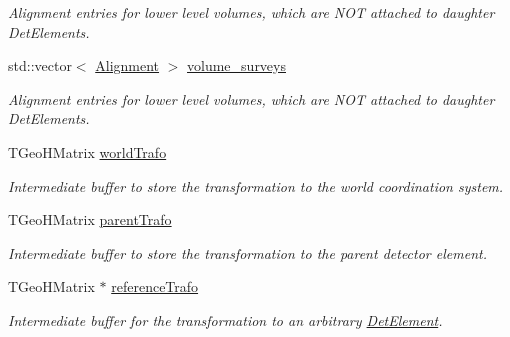 \begin{DoxyCompactItemize}
\begin{DoxyCompactList}\small\item\em Alignment entries for lower level volumes, which are N\+OT attached to daughter Det\+Elements. \end{DoxyCompactList}\item 
std\+::vector$<$ \hyperlink{class_d_d4hep_1_1_geometry_1_1_det_element_object_aaf1bb49d0e1799f548f775b35e3cb590}{Alignment} $>$ \hyperlink{class_d_d4hep_1_1_geometry_1_1_det_element_object_a7fdbe44b6eee280dc2197b7627c2012e}{volume\+\_\+surveys}
\begin{DoxyCompactList}\small\item\em Alignment entries for lower level volumes, which are N\+OT attached to daughter Det\+Elements. \end{DoxyCompactList}\end{DoxyCompactItemize}

{\bf }\par
\begin{DoxyCompactItemize}
\item 
T\+Geo\+H\+Matrix \hyperlink{class_d_d4hep_1_1_geometry_1_1_det_element_object_ae6ff583186272de915842f8fb9603590}{world\+Trafo}
\begin{DoxyCompactList}\small\item\em Intermediate buffer to store the transformation to the world coordination system. \end{DoxyCompactList}\item 
T\+Geo\+H\+Matrix \hyperlink{class_d_d4hep_1_1_geometry_1_1_det_element_object_a3d0d575da80e9a118c5e36f53e265339}{parent\+Trafo}
\begin{DoxyCompactList}\small\item\em Intermediate buffer to store the transformation to the parent detector element. \end{DoxyCompactList}\item 
T\+Geo\+H\+Matrix $\ast$ \hyperlink{class_d_d4hep_1_1_geometry_1_1_det_element_object_af2931f218ee37465cdc62733306d15f3}{reference\+Trafo}
\begin{DoxyCompactList}\small\item\em Intermediate buffer for the transformation to an arbitrary \hyperlink{class_d_d4hep_1_1_geometry_1_1_det_element}{Det\+Element}. \end{DoxyCompactList}\end{DoxyCompactItemize}

